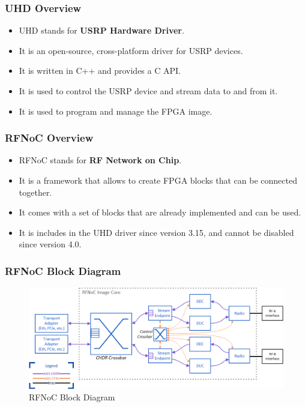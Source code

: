 \documentclass[11pt]{beamer}
\begin{document}
\begin{frame}
    \frametitle{UHD Overview}
    \begin{itemize}
        \item UHD stands for \textbf{USRP Hardware Driver}.
        \item It is an open-source, cross-platform driver for USRP devices.
        \item It is written in C++ and provides a C API.
        \item It is used to control the USRP device and stream data to and from it.
        \item It is used to program and manage the FPGA image.
    \end{itemize}
\end{frame}

\begin{frame}
    \frametitle{RFNoC Overview}
    \begin{itemize}
        \item RFNoC stands for \textbf{RF Network on Chip}.
        \item It is a framework that allows to create FPGA blocks that can be connected together.
        \item It comes with a set of blocks that are already implemented and can be used.
        \item It is includes in the UHD driver since version 3.15, and cannot be disabled since version 4.0.
    \end{itemize}
\end{frame}

\begin{frame}
    \frametitle{RFNoC Block Diagram}
    \begin{figure}
        \centering
        \includegraphics[width=\textwidth]{simplified_rfnoc_image_uhd_4.png}
        \caption{RFNoC Block Diagram}
    \end{figure}
\end{frame}
\end{document}
